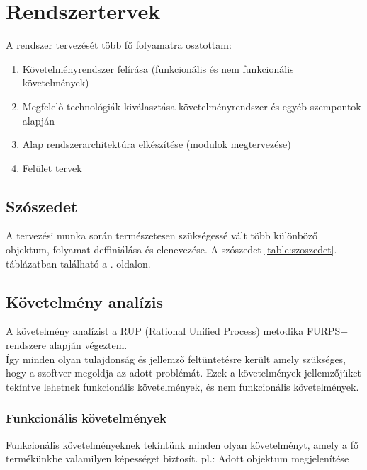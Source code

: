 \documentclass[a4paper,12pt,oneside]{report}
\begin{document}
\section{Rendszertervek}
A rendszer tervezését több fő folyamatra osztottam:
\begin{enumerate}
	\itemsep0em
	\item Követelményrendszer felírása (funkcionális és nem funkcionális követelmények)
	\item Megfelelő technológiák kiválasztása követelményrendszer és egyéb szempontok alapján
	\item Alap rendszerarchitektúra elkészítése (modulok megtervezése)
	\item Felület tervek
\end{enumerate}

\subsection{Szószedet}
A tervezési munka során természetesen szükségessé vált több különböző objektum, folyamat deffiniálása és elenevezése.
A szószedet \ref{table:szoszedet}. táblázatban található a \pageref{table:diff_soft}. oldalon.

\subsection{Követelmény analízis}
A követelmény analízist a RUP (Rational Unified Process) metodika FURPS+ rendszere alapján végeztem.\\Így minden olyan tulajdonság és jellemző feltüntetésre került amely szükséges, hogy a szoftver megoldja az adott problémát. \cite{website:soft_req_def} Ezek a követelmények jellemzőjüket tekíntve lehetnek funkcionális követelmények, és nem funkcionális követelmények.

\subsubsection{Funkcionális követelmények}
Funkcionális követelményeknek tekíntünk minden olyan követelményt, amely a fő termékünkbe valamilyen képességet biztosít. pl.: Adott objektum megjelenítése \cite{website:soft_func_req_ibm}
\end{document}
